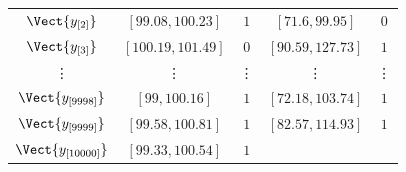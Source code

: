 \documentclass[10pt]{report}
\begin{document}
\begin{exercice}
\begin{enumerate}
\begin{center}
\begin{tabular}{c|cc|cc}
    \\ 

    
        $\Vect{y_{[2]}}$
         & 
    
        $[99.08,100.23]$
         & 
    
        $1$
         & 
    
        $[71.6,99.95]$
         & 
    
        $0$
        
    \\ 

    
        $\Vect{y_{[3]}}$
         & 
    
        $[100.19,101.49]$
         & 
    
        $0$
         & 
    
        $[90.59,127.73]$
         & 
    
        $1$
        
    \\ 

    
        \vdots
         & 
    
        \vdots
         & 
    
        \vdots
         & 
    
        \vdots
         & 
    
        \vdots
        
    \\ 

    
        $\Vect{y_{[9998]}}$
         & 
    
        $[99,100.16]$
         & 
    
        $1$
         & 
    
        $[72.18,103.74]$
         & 
    
        $1$
        
    \\ 

    
        $\Vect{y_{[9999]}}$
         & 
    
        $[99.58,100.81]$
         & 
    
        $1$
         & 
    
        $[82.57,114.93]$
         & 
    
        $1$
        
    \\ 

    
        $\Vect{y_{[10000]}}$
         & 
    
        $[99.33,100.54]$
         & 
    
        $1$
         & 
    

\end{tabular}
\end{center}
\end{enumerate}
\end{exercice}
\end{document}
